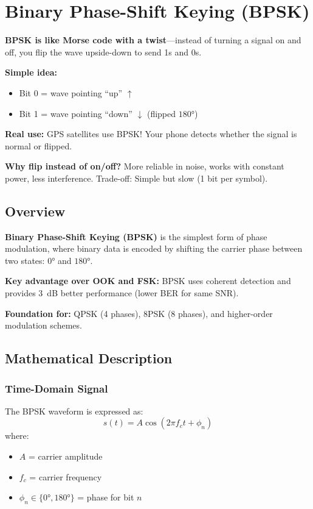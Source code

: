 \chapter{Binary Phase-Shift Keying (BPSK)}
\label{ch:bpsk}

\begin{nontechnical}
\textbf{BPSK is like Morse code with a twist}---instead of turning a signal on and off, you flip the wave upside-down to send 1s and 0s.

\textbf{Simple idea:}
\begin{itemize}
\item Bit 0 = wave pointing ``up'' $\uparrow$
\item Bit 1 = wave pointing ``down'' $\downarrow$ (flipped $180°$)
\end{itemize}

\textbf{Real use:} GPS satellites use BPSK! Your phone detects whether the signal is normal or flipped.

\textbf{Why flip instead of on/off?} More reliable in noise, works with constant power, less interference. Trade-off: Simple but slow (1 bit per symbol).
\end{nontechnical}

\section{Overview}

\textbf{Binary Phase-Shift Keying (BPSK)} is the simplest form of phase modulation, where binary data is encoded by shifting the carrier phase between two states: $0°$ and $180°$.

\textbf{Key advantage over OOK and FSK:} BPSK uses coherent detection and provides 3~dB better performance (lower BER for same SNR).

\textbf{Foundation for:} QPSK (4 phases), 8PSK (8 phases), and higher-order modulation schemes.

\section{Mathematical Description}

\subsection{Time-Domain Signal}

The BPSK waveform is expressed as:
\begin{equation}
s(t) = A \cos(2\pi f_c t + \phi_n)
\end{equation}
where:
\begin{itemize}
\item $A$ = carrier amplitude
\item $f_c$ = carrier frequency
\item $\phi_n \in \{0°, 180°\}$ = phase for bit $n$
\end{itemize}

